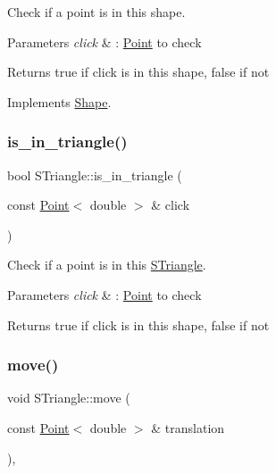 Check if a point is in this shape. 


\begin{DoxyParams}{Parameters}
{\em click} & \+: \hyperlink{classPoint}{Point} to check \\
\hline
\end{DoxyParams}
\begin{DoxyReturn}{Returns}
true if click is in this shape, false if not 
\end{DoxyReturn}


Implements \hyperlink{classShape_aa09a621da090e42840b4bec7ffb27620}{Shape}.

\mbox{\label{classSTriangle_a6824246f68484d8d8159a3315df257a4}} 
\subsubsection{\texorpdfstring{is\+\_\+in\+\_\+triangle()}{is\_in\_triangle()}}
{\footnotesize\ttfamily bool S\+Triangle\+::is\+\_\+in\+\_\+triangle (\begin{DoxyParamCaption}\item[{const \hyperlink{classPoint}{Point}$<$ double $>$ \&}]{click }\end{DoxyParamCaption})}



Check if a point is in this \hyperlink{classSTriangle}{S\+Triangle}. 


\begin{DoxyParams}{Parameters}
{\em click} & \+: \hyperlink{classPoint}{Point} to check \\
\hline
\end{DoxyParams}
\begin{DoxyReturn}{Returns}
true if click is in this shape, false if not 
\end{DoxyReturn}
\mbox{\label{classSTriangle_ac72888032cde56407193da9435e2fcc0}} 
\subsubsection{\texorpdfstring{move()}{move()}}
{\footnotesize\ttfamily void S\+Triangle\+::move (\begin{DoxyParamCaption}\item[{const \hyperlink{classPoint}{Point}$<$ double $>$ \&}]{translation }\end{DoxyParamCaption})\hspace{0.3cm}{\ttfamily [override]}, {\ttfamily [virtual]}}



